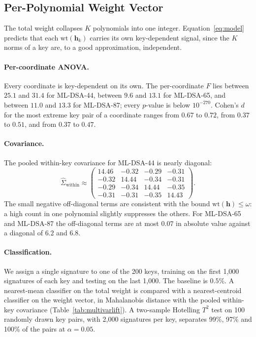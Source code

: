 \documentclass{article}
\newcommand{\hint}{\mathbf{h}}
\newcommand{\wt}[1]{\mathrm{wt}(#1)}
\begin{document}
\subsection{Per-Polynomial Weight Vector}
\label{sec:l1vector}

The total weight collapses $K$ polynomials into one integer.
Equation~\eqref{eq:model} predicts that each $\wt{\hint_k}$ carries its own
key-dependent signal, since the $K$ norms of a key are, to a good approximation, independent.

\paragraph{Per-coordinate ANOVA.}
Every coordinate is key-dependent on its own.  The per-coordinate $F$ lies
between $25.1$ and $31.4$ for ML-DSA-44, between $9.6$ and $13.1$ for
ML-DSA-65, and between $11.0$ and $13.3$ for ML-DSA-87; every $p$-value is
below $10^{-270}$.  Cohen's $d$ for the most extreme key pair of a coordinate
ranges from $0.67$ to $0.72$, from $0.37$ to $0.51$, and from $0.37$ to
$0.47$.

\paragraph{Covariance.}
The pooled within-key covariance for ML-DSA-44 is nearly diagonal:
\[
\hat{\Sigma}_\text{within} \approx
\begin{pmatrix}
 14.46 & -0.32 & -0.29 & -0.31 \\
-0.32 &  14.44 & -0.34 & -0.31 \\
-0.29 & -0.34 &  14.44 & -0.35 \\
-0.31 & -0.31 & -0.35 &  14.43
\end{pmatrix}.
\]
The small negative off-diagonal terms are consistent with the bound
$\wt{\hint} \le \omega$: a high count in one polynomial slightly
suppresses the others.  For ML-DSA-65 and ML-DSA-87 the off-diagonal terms
are at most $0.07$ in absolute value against a diagonal of $6.2$ and $6.8$.

\paragraph{Classification.}
We assign a single signature to one of the 200 keys, training on the first
1,000 signatures of each key and testing on the last 1,000.  The baseline is
$0.5\%$.  A nearest-mean classifier on the total weight is compared with a
nearest-centroid classifier on the weight vector, in Mahalanobis distance with
the pooled within-key covariance (Table~\ref{tab:multivarlift}).  A two-sample
Hotelling $T^2$ test on 100 randomly drawn key pairs, with 2,000 signatures
per key, separates 99\%, 97\% and 100\% of the pairs at $\alpha = 0.05$.
\end{document}
